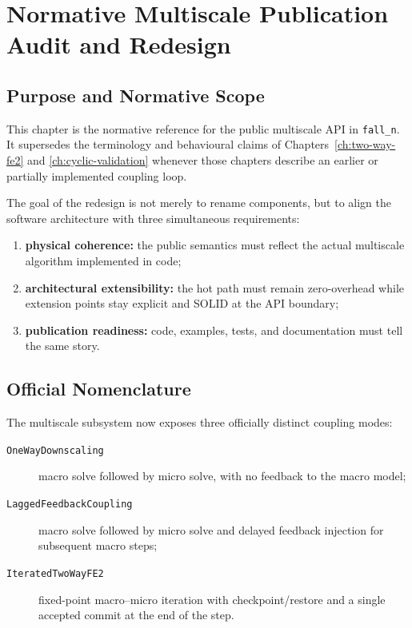 
\chapter{Normative Multiscale Publication Audit and Redesign}
\label{ch:multiscale-publication-audit}

\section{Purpose and Normative Scope}
\label{sec:ms-pub-purpose}

This chapter is the normative reference for the public multiscale API in
\texttt{fall\_n}.  It supersedes the terminology and behavioural claims of
Chapters~\ref{ch:two-way-fe2} and \ref{ch:cyclic-validation} whenever those
chapters describe an earlier or partially implemented coupling loop.

The goal of the redesign is not merely to rename components, but to align the
software architecture with three simultaneous requirements:
\begin{enumerate}
  \item \textbf{physical coherence:} the public semantics must reflect the
    actual multiscale algorithm implemented in code;
  \item \textbf{architectural extensibility:} the hot path must remain
    zero-overhead while extension points stay explicit and SOLID at the API
    boundary;
  \item \textbf{publication readiness:} code, examples, tests, and
    documentation must tell the same story.
\end{enumerate}

\section{Official Nomenclature}
\label{sec:ms-pub-nomenclature}

The multiscale subsystem now exposes three officially distinct coupling modes:
\begin{description}
  \item[\texttt{OneWayDownscaling}] macro solve followed by micro solve, with no
    feedback to the macro model;
  \item[\texttt{LaggedFeedbackCoupling}] macro solve followed by micro solve and
    delayed feedback injection for subsequent macro steps;
  \item[\texttt{IteratedTwoWayFE2}] fixed-point macro--micro iteration with
    checkpoint/restore and a single accepted commit at the end of the step.
\end{description}

